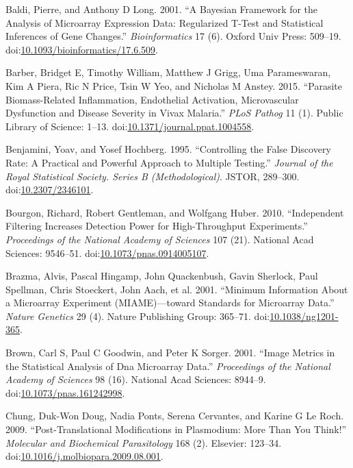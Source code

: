 \documentclass[a4paper]{article}
\begin{document}
\hypertarget{ref-baldi2001cybert}{}
Baldi, Pierre, and Anthony D Long. 2001. ``A Bayesian Framework for the
Analysis of Microarray Expression Data: Regularized T-Test and
Statistical Inferences of Gene Changes.'' \emph{Bioinformatics} 17 (6).
Oxford Univ Press: 509--19.
doi:\href{https://doi.org/10.1093/bioinformatics/17.6.509}{10.1093/bioinformatics/17.6.509}.

\hypertarget{ref-barber2015}{}
Barber, Bridget E, Timothy William, Matthew J Grigg, Uma Parameswaran,
Kim A Piera, Ric N Price, Tsin W Yeo, and Nicholas M Anstey. 2015.
``Parasite Biomass-Related Inflammation, Endothelial Activation,
Microvascular Dysfunction and Disease Severity in Vivax Malaria.''
\emph{PLoS Pathog} 11 (1). Public Library of Science: 1--13.
doi:\href{https://doi.org/10.1371/journal.ppat.1004558}{10.1371/journal.ppat.1004558}.

\hypertarget{ref-benjamini1995fdr}{}
Benjamini, Yoav, and Yosef Hochberg. 1995. ``Controlling the False
Discovery Rate: A Practical and Powerful Approach to Multiple Testing.''
\emph{Journal of the Royal Statistical Society. Series B
(Methodological)}. JSTOR, 289--300.
doi:\href{https://doi.org/10.2307/2346101}{10.2307/2346101}.

\hypertarget{ref-bourgon2010filter}{}
Bourgon, Richard, Robert Gentleman, and Wolfgang Huber. 2010.
``Independent Filtering Increases Detection Power for High-Throughput
Experiments.'' \emph{Proceedings of the National Academy of Sciences}
107 (21). National Acad Sciences: 9546--51.
doi:\href{https://doi.org/10.1073/pnas.0914005107}{10.1073/pnas.0914005107}.

\hypertarget{ref-brazma2001}{}
Brazma, Alvis, Pascal Hingamp, John Quackenbush, Gavin Sherlock, Paul
Spellman, Chris Stoeckert, John Aach, et al. 2001. ``Minimum Information
About a Microarray Experiment (MIAME)---toward Standards for Microarray
Data.'' \emph{Nature Genetics} 29 (4). Nature Publishing Group: 365--71.
doi:\href{https://doi.org/10.1038/ng1201-365}{10.1038/ng1201-365}.

\hypertarget{ref-brown2001image}{}
Brown, Carl S, Paul C Goodwin, and Peter K Sorger. 2001. ``Image Metrics
in the Statistical Analysis of Dna Microarray Data.'' \emph{Proceedings
of the National Academy of Sciences} 98 (16). National Acad Sciences:
8944--9.
doi:\href{https://doi.org/10.1073/pnas.161242998}{10.1073/pnas.161242998}.

\hypertarget{ref-leroch2009postmod}{}
Chung, Duk-Won Doug, Nadia Ponts, Serena Cervantes, and Karine G Le
Roch. 2009. ``Post-Translational Modifications in Plasmodium: More Than
You Think!'' \emph{Molecular and Biochemical Parasitology} 168 (2).
Elsevier: 123--34.
doi:\href{https://doi.org/10.1016/j.molbiopara.2009.08.001}{10.1016/j.molbiopara.2009.08.001}.
\end{document}
